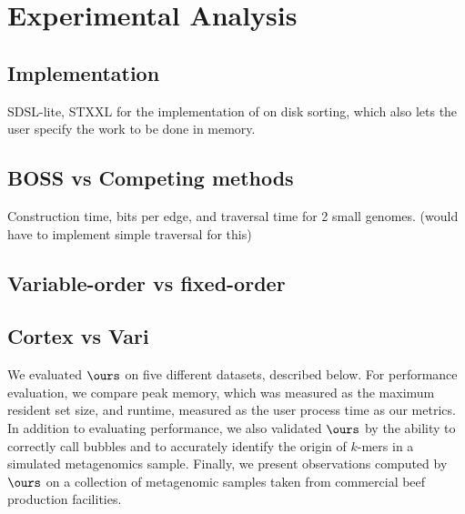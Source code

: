 \chapter{Experimental Analysis}
\label{sec:experiments}

\section{Implementation}
SDSL-lite, STXXL for the implementation of on disk sorting, which also lets the user specify the work to be done in memory.


\section{BOSS vs Competing methods}
Construction time, bits per edge, and traversal time for 2 small genomes.
(would have to implement simple traversal for this)

\section{Variable-order vs fixed-order}
%



\section{Cortex vs Vari}


We evaluated $\ours$ on five different datasets, described below.  For performance evaluation, we compare peak memory, which was measured as the maximum resident set size, and runtime, measured as the user process time as our metrics.  In addition to evaluating performance, we also validated $\ours$ by the ability to correctly call bubbles and to accurately identify the origin of $k$-mers in a simulated metagenomics sample.  Finally, we present observations computed by $\ours$ on a collection of metagenomic samples taken from commercial beef production facilities.



